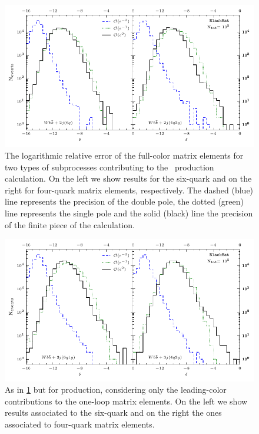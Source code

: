 \begin{figure}[h]
  \centering
  \includegraphics[scale=1.1]{plots/numstab2j}
  \caption{
    The logarithmic relative error of the full-color matrix elements
    for two types of subprocesses contributing to the \Wbbjj~production calculation. On the
    left we show results for the
    six-quark and on the right for four-quark matrix elements, respectively.
    The dashed (blue) line represents the precision of the double pole, the dotted
    (green) line represents the single pole and the
  solid (black) line the precision of the finite piece of the calculation.}
  \label{fig:stabilityWbb2j}
\end{figure}
\begin{figure}[h]
  \centering
  \includegraphics[scale=1.1]{plots/numstab3j}
  \caption{As in \cref{fig:stabilityWbb2j} but for \Wbbjjj{} production,
  considering only the leading-color contributions to the one-loop matrix elements.
  On the left we show results associated to the six-quark and on the right the ones associated to
four-quark matrix elements.}
\label{fig:stabilityWbb3j}
\end{figure}



